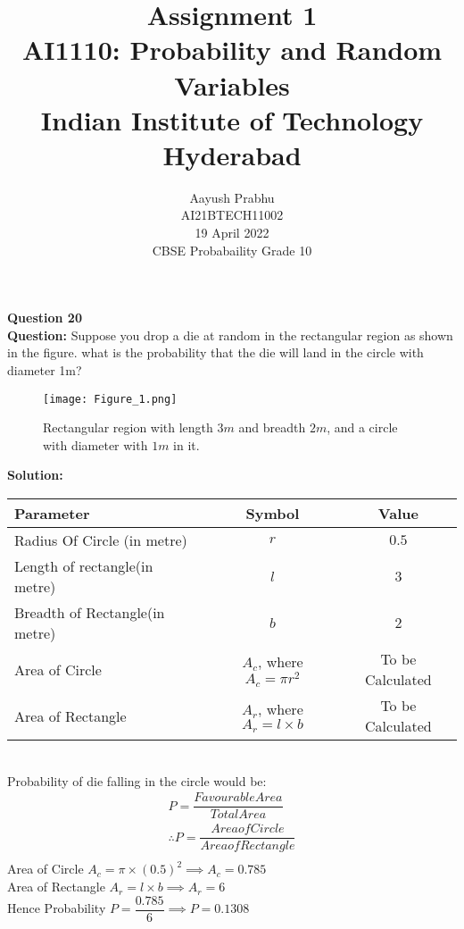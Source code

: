 \documentclass[journal,12pt,twocolumn]{IEEEtran}
\title{Assignment 1 \\ \Large AI1110: Probability and Random Variables \\ \large Indian Institute of Technology Hyderabad}
\author{Aayush Prabhu \\ \normalsize AI21BTECH11002 \\ \vspace*{20pt} \normalsize  19 April 2022 \\ \vspace*{20pt} \Large CBSE Probabaility Grade 10}
\begin{document}
       \maketitle
       \textbf{Question 20}\\
       \textbf{Question:} Suppose you drop a die at random in the rectangular region as shown in the figure. what is the probability that the die will land in the circle with diameter 1m? 
       \begin{figure}[h]
       \texttt{[image: Figure\_1.png]}
       \caption{Rectangular region with length $3m$ and breadth $2m$, and a circle with diameter with $1m $ in it.}
       \label{fig:my_label}
       \end{figure}
       \textbf{Solution:}\\
       \begin{table}[h]
    \label{tab:table1}
    \begin{tabular}{l|c|c} 
    \hline
      \textbf{Parameter} & \textbf{Symbol} & \textbf{Value}\\
      \hline
      Radius Of Circle (in metre)  & $r$ & $0.5$ \\
      \hline
      Length of rectangle(in metre) & $l$ & $3$\\
      \hline
      Breadth of Rectangle(in metre) & $b$ & $2$\\
      \hline
      Area of Circle & $A_c$, where $A_c=\pi r^2$ & To be Calculated\\
      \hline
      Area of Rectangle & $A_r$, where $A_r=l\times b$ & To be Calculated\\
      \hline
    \end{tabular}
    \end{table}\\
           Probability of die falling in the circle would be:\\
       \begin{align}
       P=\dfrac{Favourable Area}{Total Area}\\
       \therefore P=\dfrac{Area of Circle}{Area of Rectangle}\\
       \end{align}
    Area of Circle $A_c=\pi\times(0.5)^2 \implies A_c=0.785$\\
    Area of Rectangle $A_r=l\times b \implies A_r=6$\\
    Hence Probability $P=\dfrac{0.785}{6} \implies P=0.1308$\\ 
\end{document}
